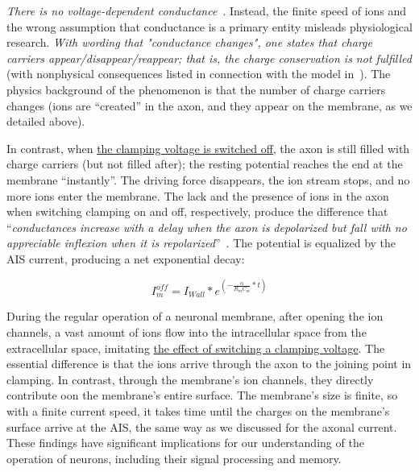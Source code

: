 \emph{There is no voltage-dependent conductance}~\cite{KochVoltageDependentConductance:1999}.
Instead, the finite speed of ions and the wrong assumption that conductance
is a primary entity misleads physiological research.\emph{ With wording
	that "conductance changes", one states that charge carriers
	appear/disappear/reappear; that is, the charge conservation is not
	fulfilled} (with nonphysical consequences listed in connection with
the model in~\cite{HodgkinHuxley:1952}). The physics background
of the phenomenon is that the number of charge carriers changes (ions
are ``created'' in the axon, and they appear on the membrane, as
we detailed above).

In contrast, when \hyperlink{voltage-clamping}{the clamping voltage is switched off}, the axon is still
filled with charge carriers (but not filled after); the resting potential reaches the end
at the membrane ``instantly''. The driving force disappears, the
ion stream stops, and no more ions enter the membrane. The lack and
the presence of ions in the axon when switching clamping on and off, respectively, produce the difference that ``\emph{conductances
	increase with a delay when the axon is depolarized but fall with no
	appreciable inflexion when it is repolarized}''~\cite{HodgkinHuxley:1952}.
The potential is equalized by the \gls{AIS} current, producing a net
exponential decay:

\begin{equation}
	I_{m}^{off}=I_{Wall}*e^{(-\frac{\alpha}{R_{m}C_{m}}*t)}\label{eq:I_Membrane_Off}
\end{equation}

\noindent 

During the regular operation of a neuronal membrane, after opening
the ion channels, a vast amount of ions flow into the intracellular
space from the extracellular space, imitating \hyperlink{voltage-clamping}{the effect of switching
a clamping voltage}. The essential difference is that
the ions arrive through the axon to the joining point in clamping. In contrast, through the membrane's ion channels, they directly contribute oon the membrane’s entire surface.  The membrane's size is finite, so with a finite
current speed, it takes time until the charges on the membrane's surface
arrive at the \gls{AIS},
the same way as we discussed for the
axonal current. These findings have significant implications for our
understanding of the operation of neurons, including their signal processing and memory.

